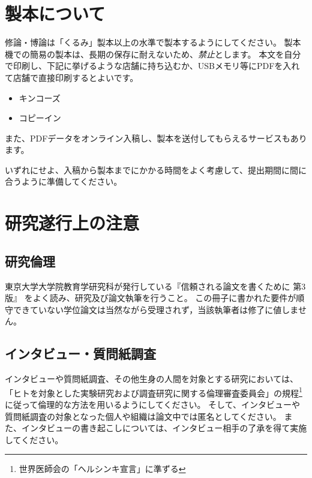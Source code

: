 
\chapter{製本について}
	\label{app:seihon}

	修論・博論は「くるみ」製本以上の水準で製本するようにしてください。
	製本機での簡易の製本は、長期の保存に耐えないため、\emph{禁止}とします。
	本文を自分で印刷し、下記に挙げるような店舗に持ち込むか、USBメモリ等にPDFを入れて店舗で直接印刷するとよいです。

	\begin{itemize}
		\item キンコーズ
		\item コピーイン
	\end{itemize}

	また、PDFデータをオンライン入稿し、製本を送付してもらえるサービスもあります。

	いずれにせよ、入稿から製本までにかかる時間をよく考慮して、提出期間に間に合うように準備してください。

\chapter{研究遂行上の注意}\label{app:ethic}

	\section{研究倫理}
		\label{sec:echic}

		東京大学大学院教育学研究科が発行している『信頼される論文を書くために 第3版』
		をよく読み、研究及び論文執筆を行うこと。
		この冊子に書かれた要件が順守できていない学位論文は当然ながら受理されず，当該執筆者は修了に値しません。

	\section{インタビュー・質問紙調査}
		\label{sec:interview}

		インタビューや質問紙調査、その他生身の人間を対象とする研究においては、「ヒトを対象とした実験研究および調査研究に関する倫理審査委員会」の規程\footnote{世界医師会の「ヘルシンキ宣言」に準ずる}に従って倫理的な方法を用いるようにしてください。
		そして、インタビューや質問紙調査の対象となった個人や組織は論文中では匿名としてください。
		また、インタビューの書き起こしについては、インタビュー相手の了承を得て実施してください。

